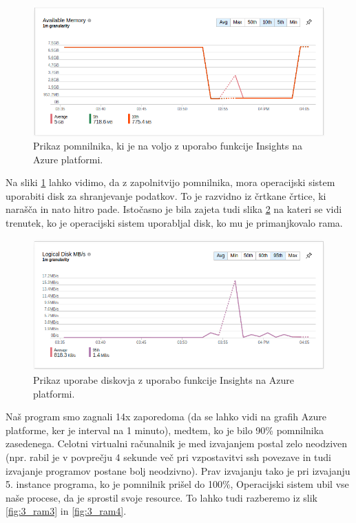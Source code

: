 \begin{figure}[H]
	\centering
	\includegraphics[scale=0.46]{Img/3_ram_obr1.png}
	\caption{Prikaz pomnilnika, ki je na voljo z uporabo funkcije Insights na Azure platformi.}
	\label{fig:3_ram1}
\end{figure}

Na sliki \ref{fig:3_ram1} lahko vidimo, da z zapolnitvijo pomnilnika, mora operacijski sistem uporabiti disk za shranjevanje podatkov. To je razvidno iz črtkane črtice, ki narašča in nato hitro pade. Istočasno je bila zajeta tudi slika \ref{fig:3_ram2} na kateri se vidi trenutek, ko je operacijski sistem uporabljal disk, ko mu je primanjkovalo rama. 

\begin{figure}[H]
	\centering
	\includegraphics[scale=0.46]{Img/3_ram_obr2.png}
	\caption{Prikaz  uporabe diskovja z uporabo funkcije Insights na Azure platformi.}
	\label{fig:3_ram2}
\end{figure}


Naš program smo zagnali 14x zaporedoma (da se lahko vidi na grafih Azure platforme, ker je interval na 1 minuto), medtem, ko je bilo 90\% pomnilnika zasedenega. Celotni virtualni računalnik je med izvajanjem postal zelo neodziven (npr. rabil je v povprečju 4 sekunde več pri vzpostavitvi ssh povezave in tudi izvajanje programov postane bolj neodzivno). Prav izvajanju  tako je pri izvajanju 5. instance programa, ko je pomnilnik prišel do 100\%, Operacijski sistem ubil vse naše procese, da je sprostil svoje resource. To lahko tudi razberemo iz slik \ref{fig:3_ram3} in \ref{fig:3_ram4}.


